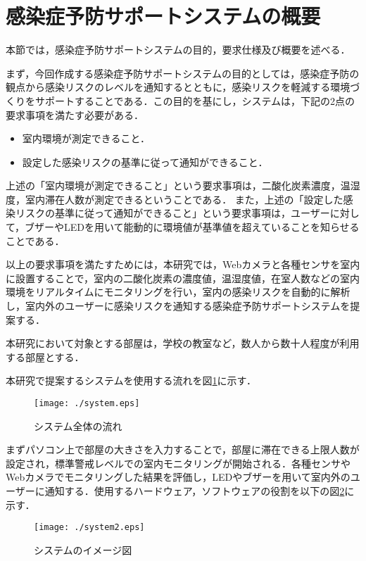
\section{感染症予防サポートシステムの概要}

本節では，感染症予防サポートシステムの目的，要求仕様及び概要を述べる．

まず，今回作成する感染症予防サポートシステムの目的としては，感染症予防の観点から感染リスクのレベルを通知するとともに，感染リスクを軽減する環境づくりをサポートすることである．この目的を基にし，システムは，下記の2点の要求事項を満たす必要がある．

\begin{itemize}
\item 室内環境が測定できること．
\item 設定した感染リスクの基準に従って通知ができること．
\end{itemize}

上述の「室内環境が測定できること」という要求事項は，二酸化炭素濃度，温湿度，室内滞在人数が測定できるということである．
また，上述の「設定した感染リスクの基準に従って通知ができること」という要求事項は，ユーザーに対して，ブザーやLEDを用いて能動的に環境値が基準値を超えていることを知らせることである．

以上の要求事項を満たすためには，本研究では，Webカメラと各種センサを室内に設置することで，室内の二酸化炭素の濃度値，温湿度値，在室人数などの室内環境をリアルタイムにモニタリングを行い，室内の感染リスクを自動的に解析し，室内外のユーザーに感染リスクを通知する感染症予防サポートシステムを提案する．

本研究において対象とする部屋は，学校の教室など，数人から数十人程度が利用する部屋とする．


本研究で提案するシステムを使用する流れを図\ref{summary1}に示す．


\begin{figure}[htbp]
\centering
\texttt{[image: ./system.eps]}
\caption{システム全体の流れ}
\label{summary1}
\end{figure}


まずパソコン上で部屋の大きさを入力することで，部屋に滞在できる上限人数が設定され，標準警戒レベルでの室内モニタリングが開始される．各種センサやWebカメラでモニタリングした結果を評価し，LEDやブザーを用いて室内外のユーザーに通知する．使用するハードウェア，ソフトウェアの役割を以下の図\ref{summary2}に示す．


\begin{figure}[htbp]
\centering
\texttt{[image: ./system2.eps]}
\caption{システムのイメージ図}
\label{summary2}
\end{figure}



